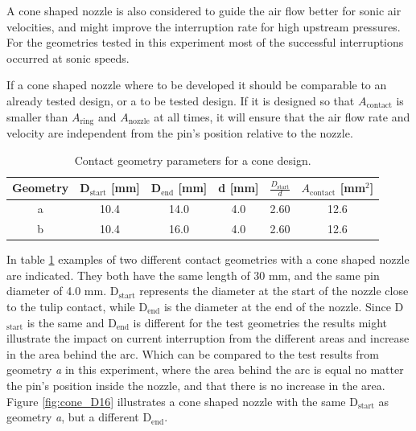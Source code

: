 \documentclass[10pt,a4paper,twoside]{article}
\begin{document}
A cone shaped nozzle is also considered to guide the air flow better for sonic air velocities, and might improve the interruption rate for high upstream pressures. For the geometries tested in this experiment most of the successful interruptions occurred at sonic speeds.

If a cone shaped nozzle where to be developed it should be comparable to an already tested design, or a to be tested design. If it is designed so that $A_\mathrm{{contact}}$ is smaller than $A_\mathrm{{ring}}$ and $A_\mathrm{{nozzle}}$ at all times, it will ensure that the air flow rate and velocity are independent from the pin's position relative to the nozzle. 

\begin{table}[H]
\center
\caption{Contact geometry parameters for a cone design.}
 \begin{tabular}{|c|c|c|c|c|c|}
\hline 
Geometry & D$_\mathrm{{start}}$ [mm]& D$_\mathrm{{end}}$ [mm] & d [mm] & $\frac{D_\mathrm{{start}}}{d}$ & $A_\mathrm{{contact}}$ [mm$^2$] \\ 
\hline 
a & 10.4 & 14.0 & 4.0 & 2.60 & 12.6  \\ 
\hline 
b & 10.4 & 16.0 & 4.0 & 2.60 & 12.6  \\ 
\hline 
\end{tabular} 
\label{tab:contGeoParaCone}
\end{table}

In table \ref{tab:contGeoParaCone} examples of two different contact geometries with a cone shaped nozzle are indicated. They both have the same length of 30 mm, and the same pin diameter of 4.0 mm. D$_\mathrm{{start}}$ represents the diameter at the start of the nozzle close to the tulip contact, while D$_\mathrm{{end}}$ is the diameter at the end of the nozzle. Since D$_\mathrm{{start}}$ is the same and D$_\mathrm{{end}}$ is different for the test geometries the results might illustrate the impact on current interruption from the different areas and increase in the area behind the arc. Which can be compared to the test results from geometry \textit{a} in this experiment, where the area behind the arc is equal no matter the pin's position inside the nozzle, and that there is no increase in the area. Figure \ref{fig:cone_D16} illustrates a cone shaped nozzle with the same  D$_\mathrm{{start}}$ as geometry \textit{a}, but a different D$_\mathrm{{end}}$. 
\end{document}
